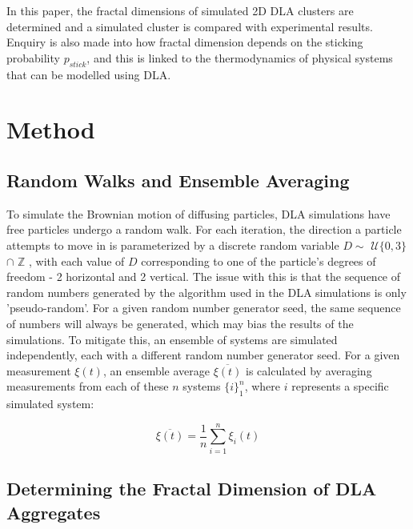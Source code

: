 \documentclass[11pt]{iopart}
\begin{document}
In this paper, the fractal dimensions of simulated 2D DLA clusters are determined and a simulated cluster is compared with experimental results. Enquiry is also made into how fractal dimension depends on the sticking probability $p_{stick}$, and this is linked to the thermodynamics of physical systems that can be modelled using DLA.

\section{Method}
\subsection{Random Walks and Ensemble Averaging}
To simulate the Brownian motion of diffusing particles, DLA simulations have free particles undergo a random walk. For each iteration, the direction a particle attempts to move in is parameterized by a discrete random variable $D \sim$ $\mathcal{U}\{0, 3\}$ $\cap$ $\mathbb{Z}$ , with each value of $D$ corresponding to one of the particle's degrees of freedom - 2 horizontal and 2 vertical. The issue with this is that the sequence of random numbers generated by the algorithm used in the DLA simulations is only 'pseudo-random'. For a given random number generator seed, the same sequence of numbers will always be generated, which may bias the results of the simulations. To mitigate this, an ensemble of systems are simulated independently, each with a different random number generator seed. For a given measurement $\xi(t)$, an ensemble average $\overline{\xi(t)}$ is calculated by averaging measurements from each of these $n$ systems $\{i\}_1^n$, where $i$ represents a specific simulated system:


\begin{equation}
\label{averageequation}
\overline{\xi(t)} = \frac{1}{n}\sum_{i=1}^{n}{\xi_i(t)}
\end{equation}


\subsection{Determining the Fractal Dimension of DLA Aggregates}
\end{document}
